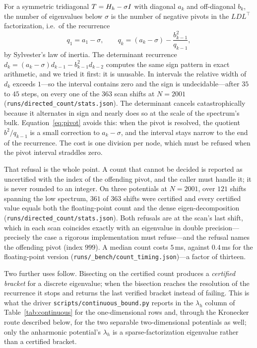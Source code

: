 For a symmetric tridiagonal $T=H_h-\sigma I$ with diagonal $a_k$ and
off-diagonal $b_k$, the number of eigenvalues below $\sigma$ is the number of
negative pivots in the $LDL^\top$ factorization, i.e.\ of the recurrence
\begin{equation}
  q_1 = a_1-\sigma,\qquad q_k = (a_k-\sigma) - \frac{b_{k-1}^2}{q_{k-1}} ,
  \label{eq:pivot}
\end{equation}
by Sylvester's law of inertia. The determinant recurrence
$d_k=(a_k-\sigma)d_{k-1}-b_{k-1}^2d_{k-2}$ computes the same sign pattern in
exact arithmetic, and we tried it first: it is unusable. In intervals the
relative width of $d_k$ exceeds $1$---so the interval contains zero and the
sign is undecidable---after $35$ to $45$ steps, on every one of the $363$
scan shifts at $N=2001$ (\texttt{runs/directed\_count/stats.json}). The
determinant cancels catastrophically because it alternates in sign and nearly
does so at the scale of the spectrum's bulk. Equation~\eqref{eq:pivot} avoids
this: when the pivot is resolved, the quotient $b^2/q_{k-1}$ is a small
correction to $a_k-\sigma$, and the interval stays narrow to the end of the
recurrence. The cost is one division per node, which must be refused when the
pivot interval straddles zero.

That refusal is the whole point. A count that cannot be decided is reported as
uncertified with the index of the offending pivot, and the caller must handle
it; it is never rounded to an integer. On three potentials at $N=2001$, over
$121$ shifts spanning the low spectrum, $361$ of $363$ shifts were certified
and every certified value equals both the floating-point count and the dense
eigen-decomposition (\texttt{runs/directed\_count/stats.json}). Both refusals
are at the scan's last shift, which in each scan coincides exactly with an
eigenvalue in double precision---precisely the case a rigorous implementation
must refuse---and the refusal names the offending pivot (index $999$). A
median count costs $5$\,ms, against
$0.4$\,ms for the floating-point version (\texttt{runs/\_bench/count\_timing.json})---a
factor of thirteen.

Two further uses follow. Bisecting on the certified count produces a
\emph{certified bracket} for a discrete eigenvalue; when the bisection
reaches the resolution of the recurrence it stops and returns the last
verified bracket instead of failing. This is what the driver
\texttt{scripts/continuous\_bound.py} reports in the $\lambda_h$ column of
Table~\ref{tab:continuous} for the one-dimensional rows and, through the
Kronecker route described below, for the two separable two-dimensional
potentials as well; only the anharmonic potential's
$\lambda_h$ is a sparse-factorization eigenvalue rather than a certified
bracket.

